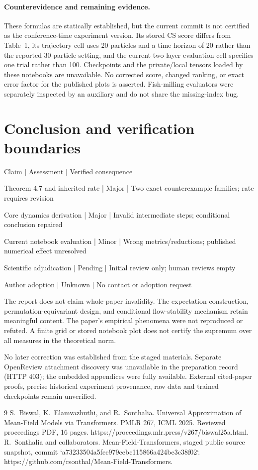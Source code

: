 \documentclass[10pt]{article}
\begin{document}
\paragraph*{Counterevidence and remaining evidence.}\mbox{}\par
These formulas are statically established, but the current commit is not certified as the conference-time experiment version. Its stored CS score differs from Table 1, its trajectory cell uses 20 particles and a time horizon of 20 rather than the reported 30-particle setting, and the current two-layer evaluation cell specifies one trial rather than 100. Checkpoints and the private/local tensors loaded by these notebooks are unavailable. No corrected score, changed ranking, or exact error factor for the published plots is asserted. Fish-milling evaluators were separately inspected by an auxiliary and do not share the missing-index bug.\par
\section*{Conclusion and verification boundaries}
Claim | Assessment | Verified consequence\par
Theorem 4.7 and inherited rate | Major | Two exact counterexample families; rate requires revision\par
Core dynamics derivation | Major | Invalid intermediate steps; conditional conclusion repaired\par
Current notebook evaluation | Minor | Wrong metrics/reductions; published numerical effect unresolved\par
Scientific adjudication | Pending | Initial review only; human reviews empty\par
Author adoption | Unknown | No contact or adoption request\par
The report does not claim whole-paper invalidity. The expectation construction, permutation-equivariant design, and conditional flow-stability mechanism retain meaningful content. The paper’s empirical phenomena were not reproduced or refuted. A finite grid or stored notebook plot does not certify the supremum over all measures in the theoretical norm.\par
No later correction was established from the staged materials. Separate OpenReview attachment discovery was unavailable in the preparation record (HTTP 403); the embedded appendices were fully available. External cited-paper proofs, precise historical experiment provenance, raw data and trained checkpoints remain unverified.\par
9 S. Biswal, K. Elamvazhuthi, and R. Sonthalia. Universal Approximation of Mean-Field Models via Transformers. PMLR 267, ICML 2025. Reviewed proceedings PDF, 16 pages. https://proceedings.mlr.press/v267/biswal25a.html. R. Sonthalia and collaborators. Mean-Field-Transformers, staged public source snapshot, commit `a73233504a5fec979cebc115866a424be3c38f02`. https://github.com/rsonthal/Mean-Field-Transformers.\par
\end{document}
